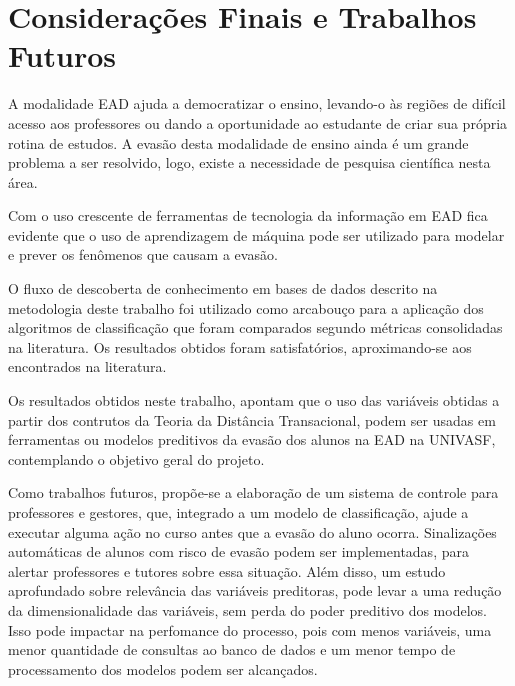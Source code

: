 \chapter{Considerações Finais e Trabalhos Futuros}

A modalidade EAD ajuda a democratizar o ensino, levando-o às regiões de difícil
acesso aos professores ou dando a oportunidade ao estudante de criar sua própria
rotina de estudos. A evasão desta modalidade de ensino ainda é um grande
problema a ser resolvido, logo, existe a necessidade de pesquisa científica
nesta área.

Com o uso crescente de ferramentas de tecnologia da informação em EAD fica
evidente que o uso de aprendizagem de máquina pode ser utilizado para modelar e
prever os fenômenos que causam a evasão.

O fluxo de descoberta de conhecimento em bases de dados descrito na metodologia
deste trabalho foi utilizado como arcabouço para a aplicação dos algoritmos de
classificação que foram comparados segundo métricas consolidadas na literatura.
Os resultados obtidos foram satisfatórios, aproximando-se aos encontrados na
literatura.

Os resultados obtidos neste trabalho, apontam que o uso das variáveis obtidas 
a partir dos contrutos da Teoria da Distância Transacional, podem ser usadas 
em ferramentas ou modelos preditivos da evasão dos alunos na EAD na UNIVASF, 
contemplando o objetivo geral do projeto.

Como trabalhos futuros, propõe-se a elaboração de um sistema de controle para
professores e gestores, que, integrado a um modelo de classificação, ajude a executar
alguma ação no curso antes que a evasão do aluno ocorra. Sinalizações automáticas de 
alunos com risco de evasão podem ser implementadas, para alertar professores e tutores 
sobre essa situação.
Além disso, um estudo aprofundado sobre relevância das variáveis preditoras, pode levar 
a uma redução da dimensionalidade das variáveis, sem perda do poder preditivo dos modelos. 
Isso pode impactar na perfomance do processo, pois com menos variáveis, uma menor quantidade 
de consultas ao banco de dados e um menor tempo de processamento dos modelos podem ser alcançados.
